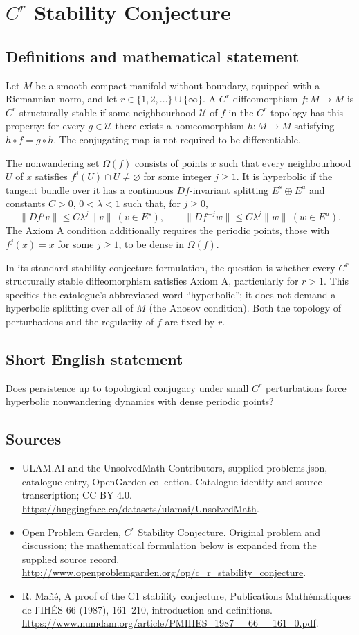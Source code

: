 \documentclass[11pt,a4paper]{article}
\begin{document}
\section*{$C^r$ Stability Conjecture}\label{statement}

\subsection{Definitions and mathematical statement}
Let $M$ be a smooth compact manifold without boundary, equipped with a
Riemannian norm, and let $r\in\{1,2,\ldots\}\cup\{\infty\}$.
A $C^r$ diffeomorphism $f:M\to M$ is $C^r$ structurally stable if some
neighbourhood $\mathcal U$ of $f$ in the $C^r$ topology has this property:
for every $g\in\mathcal U$ there exists a homeomorphism $h:M\to M$ satisfying
$h\circ f=g\circ h$. The conjugating map is not required to be differentiable.

The nonwandering set $\Omega(f)$ consists of points $x$ such that every
neighbourhood $U$ of $x$ satisfies $f^j(U)\cap U\ne\varnothing$ for some
integer $j\ge1$. It is hyperbolic if the tangent bundle over it has a continuous
$Df$-invariant splitting $E^s\oplus E^u$ and constants $C>0$, $0<\lambda<1$
such that, for $j\ge0$,
\[
 \|Df^j v\|\le C\lambda^j\|v\|\ (v\in E^s),\qquad
 \|Df^{-j}w\|\le C\lambda^j\|w\|\ (w\in E^u).
\]
The Axiom A condition additionally requires the periodic points, those with
$f^j(x)=x$ for some $j\ge1$, to be dense in $\Omega(f)$.

In its standard stability-conjecture formulation, the question is whether
every $C^r$ structurally stable diffeomorphism satisfies Axiom A, particularly
for $r>1$. This specifies the catalogue's abbreviated word ``hyperbolic'';
it does not demand a hyperbolic splitting over all of $M$ (the Anosov
condition). Both the topology of perturbations and the regularity of $f$
are fixed by $r$.
\subsection{Short English statement}
Does persistence up to topological conjugacy under small $C^r$ perturbations force hyperbolic nonwandering dynamics with dense periodic points?
\subsection{Sources}
\begin{itemize}
\item[S1] ULAM.AI and the UnsolvedMath Contributors, supplied problems.json, catalogue entry, OpenGarden collection. Catalogue identity and source transcription; CC BY 4.0.
\url{https://huggingface.co/datasets/ulamai/UnsolvedMath}.
\item[S2] Open Problem Garden, $C^r$ Stability Conjecture. Original problem and discussion; the mathematical formulation below is expanded from the supplied source record.
\url{http://www.openproblemgarden.org/op/c_r_stability_conjecture}.
\item[S3] R. Mañé, A proof of the C1 stability conjecture, Publications Mathématiques de l’IHÉS 66 (1987), 161–210, introduction and definitions.
\url{https://www.numdam.org/article/PMIHES_1987__66__161_0.pdf}.
\end{itemize}
\end{document}
